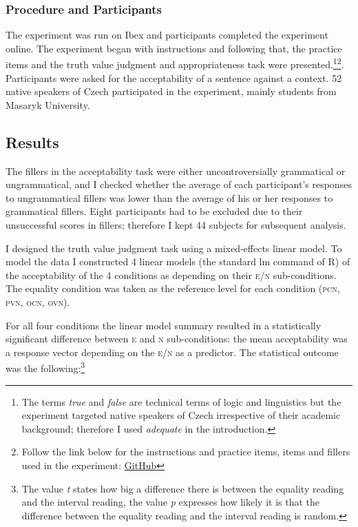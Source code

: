 \documentclass[output=paper,
]{langscibook}
\begin{document}
\subsubsection{Procedure and Participants}
The experiment was run on Ibex and participants completed the experiment online. The experiment began with instructions and following that, the practice items and the truth value judgment and appropriateness task were presented.\footnote{The terms \textit{true} and \textit{false} are technical terms of logic and linguistics but the experiment targeted native speakers of Czech irrespective of their academic background; therefore I used \textit{adequate} in the introduction.}\footnote{Follow the link below for the instructions and practice items, items and fillers used in the experiment: \href{https://github.com/ivetasafratova/Negation-comparative-and-alternatives-Experimental-evidence-from-Czech.git}{GitHub}}.
Participants were asked for the acceptability of a sentence against a context. 52 native speakers of Czech participated in the experiment, mainly students from Masaryk University.  


\subsection{Results}
The fillers in the acceptability task were either uncontroversially grammatical or ungrammatical, and I checked whether the average of each participant’s responses to ungrammatical fillers was lower than the average of his or her responses to grammatical fillers. Eight participants had to be excluded due to their unsuccessful scores in fillers; therefore I kept 44 subjects for subsequent analysis.

I designed the truth value judgment task using a mixed-effects linear model. To model the data I constructed 4 linear models (the standard lm command of R) of the acceptability of the 4 conditions as depending on their \textsc{e/n} sub-conditions. The equality condition was taken as the reference level for each condition (\textsc{pcn, pvn, ocn, ovn}). 

For all four conditions the linear model summary resulted in a statistically significant difference between \textsc{e} and \textsc{n} sub-conditions: the mean acceptability was a response vector depending on the \textsc{e/n} as a predictor. The statistical outcome was the following:\footnote{The value \textit{t} states how big a difference there is between the equality reading and the interval reading, the value \textit{p} expresses how likely it is that the difference between the equality reading and the interval reading is random.}
\end{document}
